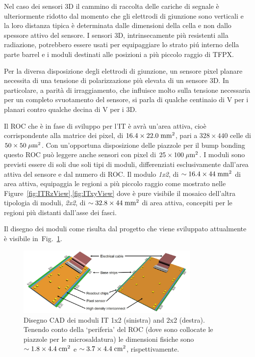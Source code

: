 Nel caso dei sensori 3D il cammino di raccolta delle cariche di segnale \`e ulteriormente ridotto dal momento che gli elettrodi di giunzione sono verticali e la loro distanza tipica \`e determinata dalle dimensioni della cella e non dallo spessore attivo del sensore. I sensori 3D, intrinsecamente pi\`u resistenti alla radiazione, potrebbero essere usati per equipaggiare lo strato pi\'u interno della parte barrel e i moduli destinati alle posizioni a pi\`u piccolo raggio di TFPX.

Per la diversa disposizione degli elettrodi di giunzione, un sensore pixel planare necessita di una tensione di polarizzazione pi\`u elevata di un sensore 3D. In particolare, a parit\`a di irraggiamento, che influisce molto sulla tensione necessaria per un completo svuotamento del sensore, si parla di qualche centinaio di V per i planari contro qualche decina di V per i 3D.

%
%

Il ROC che \`e in fase di sviluppo per l'IT \`e avr\`a un'area attiva, cio\`e corrispondente alla matrice dei pixel, di $16.4\times22.0\rm \; mm^2$, pari a $328\times440$ celle di $50\times50\; \mu \rm m^2$. Con un'opportuna disposizione delle piazzole per il bump bonding questo ROC pu\`o leggere anche sensori con pixel di $25\times100\; \mu \rm m^2$. I moduli sono previsti essere di soli due soli tipi di moduli, differenziati esclusivamente dall'area attiva del sensore e dal numero di ROC. Il modulo {\em 1x2}, di $\sim16.4\times44\rm \; mm^2$ di area attiva, equipaggia le regioni a pi\`u piccolo raggio come mostrato nelle Figure~\ref{fig:ITRzView},\ref{fig:ITxyView} dove \`e pure visibile il mosaico dell'altra tipologia di moduli, {\em 2x2}, di $\sim32.8\times44\rm \; mm^2$ di area attiva, concepiti per le regioni pi\`u distanti dall'asse dei fasci.

Il disegno dei moduli come risulta dal progetto che viene sviluppato attualmente \`e visibile in~Fig.~\ref{fig:ITModSkecth}.
\begin{figure}
\centering
\includegraphics[width=0.8\textwidth]{Immagini/ITModSkecth.PNG}
\caption{Disegno CAD dei moduli IT 1x2 (sinistra) and 2x2 (destra). Tenendo conto della `periferia' del ROC (dove sono collocate le piazzole per le microsaldatura) le dimensioni fisiche sono  $\sim1.8\times4.4\rm \; cm^2$ e  $\sim3.7\times4.4\rm \; cm^2$, rispettivamente.}  
\label{fig:ITModSkecth}
\end{figure}


